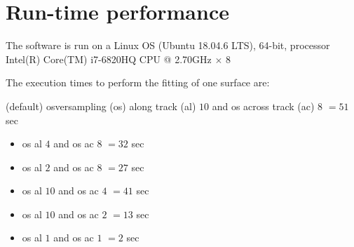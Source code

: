 \documentclass[compress,8pt]{beamer}
\begin{document}
\section{Run-time performance}
\begin{frame}


% 
% 
% 
% 

The software is run on a Linux OS (Ubuntu 18.04.6 LTS), 64-bit, processor Intel(R) Core(TM) i7-6820HQ CPU @ 2.70GHz $\times$ 8 


\bigskip

The execution times to perform the fitting of one surface are:

\medskip
(default) osversampling (os) along track (al) $10$ and os across track (ac) $8$ $= 51$ sec

\begin{itemize}
 \item os al $4$ and os ac $8$ $= 32$ sec

 \item os al $2$ and os ac $8$ $= 27$ sec

 \item os al $10$ and os ac $4$ $= 41$ sec

 \item os al $10$ and os ac $2$ $= 13$ sec

 \item os al $1$ and os ac $1$ $= 2$ sec

\end{itemize}


\end{frame}





\end{document}
